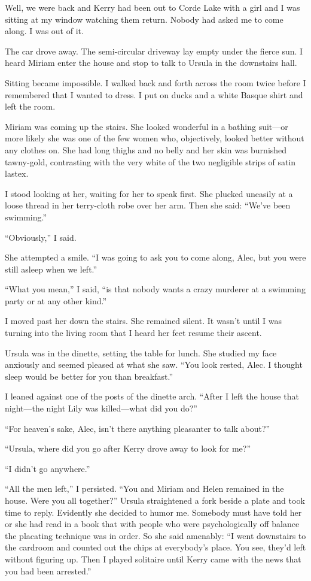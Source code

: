 {Well, we were back and Kerry had been out to Corde Lake with a girl and I was sitting at my window watching them return. Nobody had asked me to come along. I was out of it.

The car drove away. The semi-circular driveway lay empty under the fierce sun. I heard Miriam enter the house and stop to talk to Ursula in the downstairs hall.

Sitting became impossible. I walked back and forth across the room twice before I remembered that I wanted to dress. I put on ducks and a white Basque shirt and left the room.

Miriam was coming up the stairs. She looked wonderful in a bathing suit—or more likely she was one of the few women who, objectively, looked better without any clothes on. She had long thighs and no belly and her skin was burnished tawny-gold, contrasting with the very white of the two negligible strips of satin lastex.

I stood looking at her, waiting for her to speak first. She plucked uneasily at a loose thread in her terry-cloth robe over her arm. Then she said: “We’ve been swimming.”

“Obviously,” I said.

She attempted a smile. “I was going to ask you to come along, Alec, but you were still asleep when we left.”

“What you mean,” I said, “is that nobody wants a crazy murderer at a swimming party or at any other kind.”

I moved past her down the stairs. She remained silent. It wasn’t until I was turning into the living room that I heard her feet resume their ascent.

Ursula was in the dinette, setting the table for lunch. She studied my face anxiously and seemed pleased at what she saw. “You look rested, Alec. I thought sleep would be better for you than breakfast.”

I leaned against one of the posts of the dinette arch. “After I left the house that night—the night Lily was killed—what did you do?”

“For heaven’s sake, Alec, isn’t there anything pleasanter to talk about?”

“Ursula, where did you go after Kerry drove away to look for me?”

“I didn’t go anywhere.”

“All the men left,” I persisted. “You and Miriam and Helen remained in the house. Were you all together?” Ursula straightened a fork beside a plate and took time to reply. Evidently she decided to humor me. Somebody must have told her or she had read in a book that with people who were psychologically off balance the placating technique was in order. So she said amenably: “I went downstairs to the cardroom and counted out the chips at everybody’s place. You see, they’d left without figuring up. Then I played solitaire until Kerry came with the news that you had been arrested.”

}
